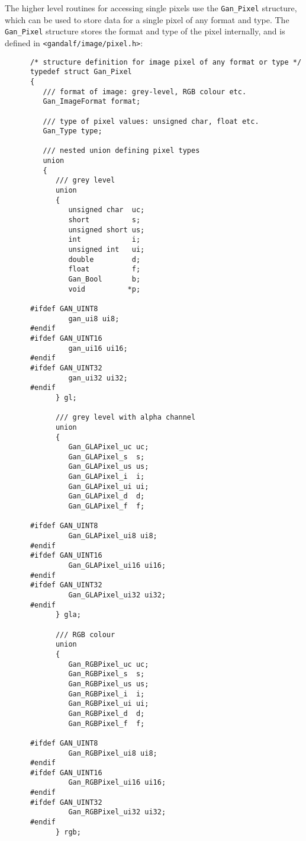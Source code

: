 The higher level routines for accessing single pixels use the {\tt Gan\_Pixel}
structure, which can be used to store data for a single pixel of any format
and type. The {\tt Gan\_Pixel} structure stores the format and type of the
pixel internally, and is defined in {\tt <gandalf/image/pixel.h>}:
\begin{verbatim}
      /* structure definition for image pixel of any format or type */
      typedef struct Gan_Pixel
      {
         /// format of image: grey-level, RGB colour etc.
         Gan_ImageFormat format;

         /// type of pixel values: unsigned char, float etc.
         Gan_Type type;

         /// nested union defining pixel types
         union
         {
            /// grey level
            union
            {
               unsigned char  uc;
               short          s;
               unsigned short us;
               int            i;
               unsigned int   ui;
               double         d;
               float          f;
               Gan_Bool       b;
               void          *p;

      #ifdef GAN_UINT8
               gan_ui8 ui8;
      #endif
      #ifdef GAN_UINT16
               gan_ui16 ui16;
      #endif
      #ifdef GAN_UINT32
               gan_ui32 ui32;
      #endif
            } gl;

            /// grey level with alpha channel
            union
            {
               Gan_GLAPixel_uc uc;
               Gan_GLAPixel_s  s;
               Gan_GLAPixel_us us;
               Gan_GLAPixel_i  i;
               Gan_GLAPixel_ui ui;
               Gan_GLAPixel_d  d;
               Gan_GLAPixel_f  f;

      #ifdef GAN_UINT8
               Gan_GLAPixel_ui8 ui8;
      #endif
      #ifdef GAN_UINT16
               Gan_GLAPixel_ui16 ui16;
      #endif
      #ifdef GAN_UINT32
               Gan_GLAPixel_ui32 ui32;
      #endif
            } gla;

            /// RGB colour
            union
            {
               Gan_RGBPixel_uc uc;
               Gan_RGBPixel_s  s;
               Gan_RGBPixel_us us;
               Gan_RGBPixel_i  i;
               Gan_RGBPixel_ui ui;
               Gan_RGBPixel_d  d;
               Gan_RGBPixel_f  f;

      #ifdef GAN_UINT8
               Gan_RGBPixel_ui8 ui8;
      #endif
      #ifdef GAN_UINT16
               Gan_RGBPixel_ui16 ui16;
      #endif
      #ifdef GAN_UINT32
               Gan_RGBPixel_ui32 ui32;
      #endif
            } rgb;


\end{verbatim}
